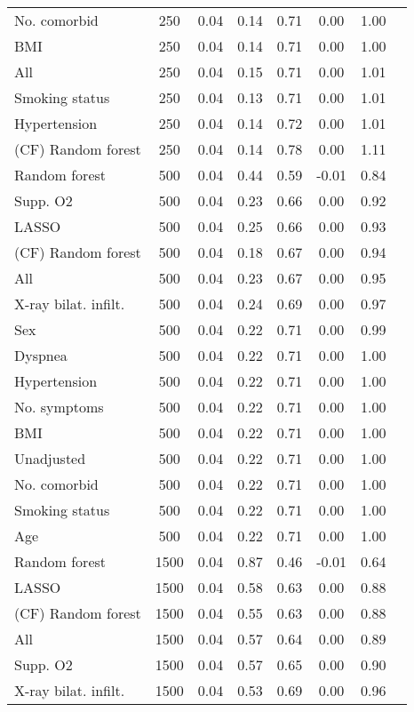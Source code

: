 \documentclass{article}
\begin{document}
{\begin{longtable}{lccccccc}
No. comorbid & 250 & 0.04 & 0.14 & 0.71 &  0.00 & 1.00 \\ 
BMI & 250 & 0.04 & 0.14 & 0.71 &  0.00 & 1.00 \\ 
All & 250 & 0.04 & 0.15 & 0.71 &  0.00 & 1.01 \\ 
Smoking status & 250 & 0.04 & 0.13 & 0.71 &  0.00 & 1.01 \\ 
Hypertension & 250 & 0.04 & 0.14 & 0.72 &  0.00 & 1.01 \\ 
(CF) Random forest & 250 & 0.04 & 0.14 & 0.78 &  0.00 & 1.11 \\ \midrule() 
Random forest & 500 & 0.04 & 0.44 & 0.59 & -0.01 & 0.84 \\ 
Supp. O2 & 500 & 0.04 & 0.23 & 0.66 &  0.00 & 0.92 \\ 
LASSO & 500 & 0.04 & 0.25 & 0.66 &  0.00 & 0.93 \\ 
(CF) Random forest & 500 & 0.04 & 0.18 & 0.67 &  0.00 & 0.94 \\ 
All & 500 & 0.04 & 0.23 & 0.67 &  0.00 & 0.95 \\ 
X-ray bilat. infilt. & 500 & 0.04 & 0.24 & 0.69 &  0.00 & 0.97 \\ 
Sex & 500 & 0.04 & 0.22 & 0.71 &  0.00 & 0.99 \\ 
Dyspnea & 500 & 0.04 & 0.22 & 0.71 &  0.00 & 1.00 \\ 
Hypertension & 500 & 0.04 & 0.22 & 0.71 &  0.00 & 1.00 \\ 
No. symptoms & 500 & 0.04 & 0.22 & 0.71 &  0.00 & 1.00 \\ 
BMI & 500 & 0.04 & 0.22 & 0.71 &  0.00 & 1.00 \\ 
Unadjusted & 500 & 0.04 & 0.22 & 0.71 &  0.00 & 1.00 \\ 
No. comorbid & 500 & 0.04 & 0.22 & 0.71 &  0.00 & 1.00 \\ 
Smoking status & 500 & 0.04 & 0.22 & 0.71 &  0.00 & 1.00 \\ 
Age & 500 & 0.04 & 0.22 & 0.71 &  0.00 & 1.00 \\ \midrule() 
Random forest & 1500 & 0.04 & 0.87 & 0.46 & -0.01 & 0.64 \\ 
LASSO & 1500 & 0.04 & 0.58 & 0.63 &  0.00 & 0.88 \\ 
(CF) Random forest & 1500 & 0.04 & 0.55 & 0.63 &  0.00 & 0.88 \\ 
All & 1500 & 0.04 & 0.57 & 0.64 &  0.00 & 0.89 \\ 
Supp. O2 & 1500 & 0.04 & 0.57 & 0.65 &  0.00 & 0.90 \\ 
X-ray bilat. infilt. & 1500 & 0.04 & 0.53 & 0.69 &  0.00 & 0.96 \\ 

\end{longtable}}
\end{document}
